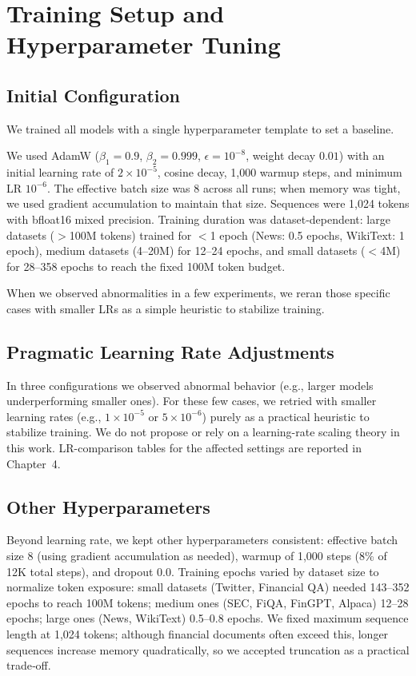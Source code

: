 \section{Training Setup and Hyperparameter Tuning}

\subsection{Initial Configuration}

We trained all models with a single hyperparameter template to set a baseline. 

We used AdamW ($\beta_1=0.9$, $\beta_2=0.999$, $\epsilon=10^{-8}$, weight decay $0.01$) with an initial learning rate of $2\times10^{-5}$, cosine decay, 1{,}000 warmup steps, and minimum LR $10^{-6}$. The effective batch size was 8 across all runs; when memory was tight, we used gradient accumulation to maintain that size. Sequences were 1{,}024 tokens with bfloat16 mixed precision. Training duration was dataset‑dependent: large datasets ($>$100M tokens) trained for $<$1 epoch (News: 0.5 epochs, WikiText: 1 epoch), medium datasets (4–20M) for 12–24 epochs, and small datasets ($<$4M) for 28–358 epochs to reach the fixed 100M token budget.

When we observed abnormalities in a few experiments, we reran those specific cases with smaller LRs as a simple heuristic to stabilize training.

\subsection{Pragmatic Learning Rate Adjustments}

In three configurations we observed abnormal behavior (e.g., larger models underperforming smaller ones). For these few cases, we retried with smaller learning rates (e.g., $1\times 10^{-5}$ or $5\times 10^{-6}$) purely as a practical heuristic to stabilize training. We do not propose or rely on a learning-rate scaling theory in this work. LR-comparison tables for the affected settings are reported in Chapter~4.

\subsection{Other Hyperparameters}

Beyond learning rate, we kept other hyperparameters consistent: effective batch size 8 (using gradient accumulation as needed), warmup of 1{,}000 steps (8\% of 12K total steps), and dropout 0.0. Training epochs varied by dataset size to normalize token exposure: small datasets (Twitter, Financial QA) needed 143–352 epochs to reach 100M tokens; medium ones (SEC, FiQA, FinGPT, Alpaca) 12–28 epochs; large ones (News, WikiText) 0.5–0.8 epochs. We fixed maximum sequence length at 1{,}024 tokens; although financial documents often exceed this, longer sequences increase memory quadratically, so we accepted truncation as a practical trade‑off.

